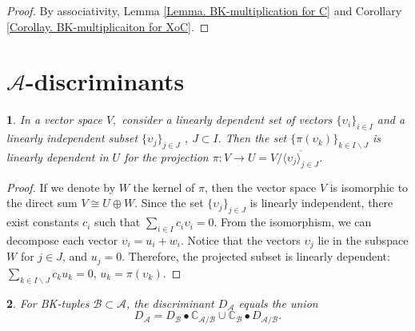 \documentclass[11pt]{article}
\theoremstyle{plain}
\newtheorem{thm}{\protect\theoremname}[section]
\theoremstyle{definition}
\theoremstyle{remark}
\theoremstyle{plain}
\newtheorem{lem}[thm]{\protect\lemmaname}
\theoremstyle{plain}
\theoremstyle{plain}
\theoremstyle{definition}
\providecommand{\lemmaname}{Lemma}
\providecommand{\theoremname}{Theorem}
\begin{document}
\begin{proof}
By associativity, Lemma \ref{Lemma. BK-multiplication for C} and
Corollary \ref{Corollay. BK-multiplicaiton for XoC}.
\end{proof}

\section{\label{Section. Discriminants for BK-tuples}$\mathscr{A}$-discriminants}
\begin{lem}
\label{Lemma. Linear Algebra}In a vector space $V,$ consider a linearly
dependent set of vectors $\{\upsilon_{i}\}_{i\in I}$ and a linearly
independent subset $\{\upsilon_{j}\}_{j\in J}$ , $J\subset I.$ Then
the set $\{\pi(\upsilon_{k})\}_{k\in I\backslash J}$ is linearly
dependent in $U$ for the projection $\pi:V\rightarrow U=V/\overline{\langle\upsilon_{j}\rangle_{j\in J}}$. 
\end{lem}

\begin{proof}
If we denote by $W$ the kernel of $\pi$, then the vector space $V$
is isomorphic to the direct sum $V\cong U\oplus W.$ Since the set
$\{\upsilon_{j}\}_{j\in J}$ is linearly independent, there exist
constants $c_{i}$ such that $\underset{i\in I}{\sum}c_{i}\upsilon_{i}=0$.
From the isomorphism, we can decompose each vector $\upsilon_{i}=u_{i}+w_{i}.$
Notice that the vectors $\upsilon_{j}$ lie in the subspace $W$ for
$j\in J$, and $u_{j}=0$. Therefore, the projected subset is linearly
dependent: $\underset{k\in I\backslash J}{\sum}c_{k}u_{k}=0$, $u_{k}=\pi(\upsilon_{k}).$
\end{proof}
\begin{thm}
\label{Theorem. Discriminatn's splitting}For BK-tuples $\mathscr{B}\subset\mathscr{A}$,
the discriminant $D_{\mathscr{A}}$ equals the union 
\[
D_{\mathscr{A}}=D_{\mathscr{B}}\bullet\mathbb{C}_{\mathscr{A}/\mathscr{B}}\cup\mathbb{C}_{\mathscr{B}}\bullet D_{\mathscr{A}/\mathscr{B}}.
\]
\end{thm}
\end{document}
